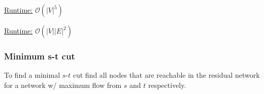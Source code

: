 \underline{Runtime:} $\mathcal{O}(\lvert V \rvert^5)$

\underline{Runtime:} $\mathcal{O}(\lvert V \rvert \lvert E \rvert^2)$

\subsubsection{Minimum s-t cut}

To find a minimal $s$-$t$ cut find all nodes that are reachable in the
residual network for a network w/ maximum flow from $s$ and $t$
respectively.


